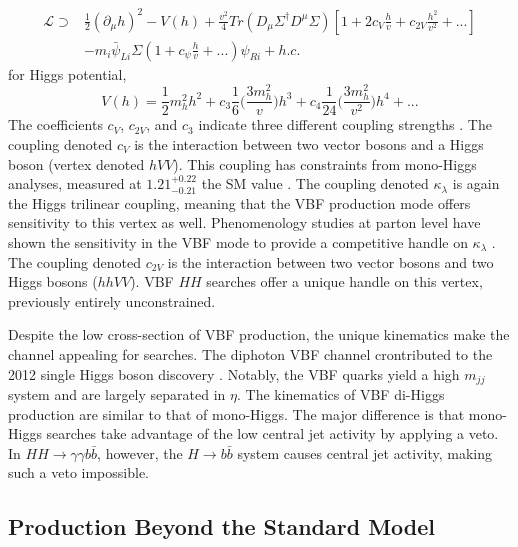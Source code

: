 \begin{equation}
    \begin{aligned}
    \mathcal{L} \supset &\frac{1}{2}(\partial_{\mu} h)^2 -V(h) + \frac{v^2}{4} Tr(D_{\mu}\Sigma^\dagger D^\mu \Sigma) [1 + 2c_{V} \frac{h}{v} + c_{2V} \frac{h^2}{v^2} + ...] \\
     &- m_i\bar{\psi}_{Li}\Sigma(1+c_{\psi}\frac{h}{v}+...)\psi_{Ri} + h.c.
    \end{aligned}
\end{equation}
for Higgs potential,
\begin{equation}
    V(h) = \frac{1}{2}m_h^2h^2 +c_3 \frac{1}{6}\bigg(\frac{3m_h^2}{v}\bigg)h^3 + c_4 \frac{1}{24}\bigg(\frac{3m_h^2}{v^2}\bigg)h^4+...
\end{equation}
The coefficients $c_V$, $c_{2V}$, and $c_3$ indicate three different coupling strengths \cite{vbfhh}. The coupling denoted $c_V$ is the interaction between two vector bosons and a Higgs boson (vertex denoted $hVV$). This coupling has constraints from mono-Higgs analyses, measured at $1.21^{+0.22}_{-0.21}$ the \gls{SM} value \cite{higgs-measurements}. The coupling denoted $\kappa_{\lambda}$ is again the Higgs trilinear coupling, meaning that the \gls{VBF} production mode offers sensitivity to this vertex as well. Phenomenology studies at parton level have shown the sensitivity in the \gls{VBF} mode to provide a competitive handle on $\kappa_{\lambda}$ \cite{vbf_lambda}. The coupling denoted $c_{2V}$ is the interaction between two vector bosons and two Higgs bosons ($hhVV$). \gls{VBF} $HH$ searches offer a unique handle on this vertex, previously entirely unconstrained.

Despite the low cross-section of \gls{VBF} production, the unique kinematics make the channel appealing for searches. The diphoton \gls{VBF} channel crontributed to the 2012 single Higgs boson discovery \cite{higgs-discovery-atlas}. Notably, the \gls{VBF} quarks yield a high $m_{jj}$ system and are largely separated in $\eta$. The kinematics of \gls{VBF} di-Higgs production are similar to that of mono-Higgs. The major difference is that mono-Higgs searches take advantage of the low central jet activity by applying a veto. In $HH \rightarrow \gamma \gamma b\bar{b}$, however, the $H \rightarrow b\bar{b}$ system causes central jet activity, making such a veto impossible.


\subsection{Production Beyond the Standard Model}

